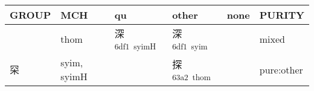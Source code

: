 \documentclass[14pt,a4paper]{scrartcl}
\begin{document}
\begin{longtable}[c]{@{}llllll@{}}
\toprule
\begin{minipage}[b]{0.14\columnwidth}\raggedright\strut
GROUP
\strut\end{minipage} &
\begin{minipage}[b]{0.14\columnwidth}\raggedright\strut
MCH
\strut\end{minipage} &
\begin{minipage}[b]{0.14\columnwidth}\raggedright\strut
qu
\strut\end{minipage} &
\begin{minipage}[b]{0.14\columnwidth}\raggedright\strut
other
\strut\end{minipage} &
\begin{minipage}[b]{0.14\columnwidth}\raggedright\strut
none
\strut\end{minipage} &
\begin{minipage}[b]{0.14\columnwidth}\raggedright\strut
PURITY
\strut\end{minipage}\tabularnewline
\midrule
\endhead
\begin{minipage}[t]{0.14\columnwidth}\raggedright\strut
𥥍
\strut\end{minipage} &
\begin{minipage}[t]{0.14\columnwidth}\raggedright\strut
thom
\strut\end{minipage} &
\begin{minipage}[t]{0.14\columnwidth}\raggedright\strut
深\textsuperscript{6df1~syimH}
\strut\end{minipage} &
\begin{minipage}[t]{0.14\columnwidth}\raggedright\strut
深\textsuperscript{6df1~syim}
\strut\end{minipage} &
\begin{minipage}[t]{0.14\columnwidth}\raggedright\strut
\strut\end{minipage} &
\begin{minipage}[t]{0.14\columnwidth}\raggedright\strut
mixed
\strut\end{minipage}\tabularnewline
\begin{minipage}[t]{0.14\columnwidth}\raggedright\strut
罙
\strut\end{minipage} &
\begin{minipage}[t]{0.14\columnwidth}\raggedright\strut
syim, syimH
\strut\end{minipage} &
\begin{minipage}[t]{0.14\columnwidth}\raggedright\strut
\strut\end{minipage} &
\begin{minipage}[t]{0.14\columnwidth}\raggedright\strut
探\textsuperscript{63a2~thom}
\strut\end{minipage} &
\begin{minipage}[t]{0.14\columnwidth}\raggedright\strut
\strut\end{minipage} &
\begin{minipage}[t]{0.14\columnwidth}\raggedright\strut
pure:other
\strut\end{minipage}\tabularnewline
\bottomrule
\end{longtable}
\end{document}

